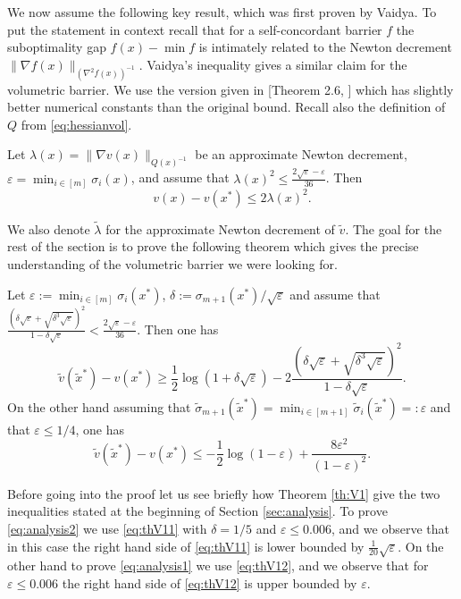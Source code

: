 \documentclass[openany]{now}
\renewcommand{\epsilon}{\varepsilon}
\renewcommand{\tilde}{\widetilde}
\begin{document}
We now assume the following key result, which was first proven by Vaidya. To put the statement in context recall that for a self-concordant barrier $f$ the suboptimality gap $f(x) - \min f$ is intimately related to the Newton decrement $\|\nabla f(x) \|_{(\nabla^2 f(x))^{-1}}$. Vaidya's inequality gives a similar claim for the volumetric barrier. We use the version given in [Theorem 2.6, \cite{Ans98}] which has slightly better numerical constants than the original bound. Recall also the definition of $Q$ from \eqref{eq:hessianvol}.

\begin{theorem} \label{th:V0}
Let $\lambda(x) = \|\nabla v(x) \|_{Q(x)^{-1}}$ be an approximate Newton decrement, $\epsilon = \min_{i \in [m]} \sigma_i(x)$, and assume that $\lambda(x)^2 \leq \frac{2 \sqrt{\epsilon} - \epsilon}{36}$. Then
$$v(x) - v(x^*) \leq 2 \lambda(x)^2 . $$
\end{theorem}
We also denote $\tilde{\lambda}$ for the approximate Newton decrement of $\tilde{v}$. The goal for the rest of the section is to prove the following theorem which gives the precise understanding of the volumetric barrier we were looking for.

\begin{theorem} \label{th:V1}
Let $\epsilon := \min_{i \in [m]} \sigma_i(x^*)$, $\delta := \sigma_{m+1}(x^*) / \sqrt{\epsilon}$ and assume that $\frac{\left(\delta \sqrt{\epsilon} + \sqrt{\delta^{3} \sqrt{\epsilon}}\right)^2}{1- \delta \sqrt{\epsilon}} < \frac{2 \sqrt{\epsilon} - \epsilon}{36}$. Then one has
\begin{equation} \label{eq:thV11}
\tilde{v}(\tilde{x}^*) - v(x^*) \geq \frac{1}{2} \log(1+\delta \sqrt{\epsilon}) - 2  \frac{\left(\delta \sqrt{\epsilon} + \sqrt{\delta^{3} \sqrt{\epsilon}}\right)^2}{1- \delta \sqrt{\epsilon}}  .
\end{equation}
On the other hand assuming that $\tilde{\sigma}_{m+1}(\tilde{x}^*) = \min_{i \in [m+1]} \tilde{\sigma}_{i}(\tilde{x}^*) =: \epsilon$ and that $\epsilon \leq 1/4$, one has 
\begin{equation} \label{eq:thV12}
\tilde{v}(\tilde{x}^*) - v(x^*) \leq - \frac{1}{2} \log(1 - \epsilon) + \frac{8 \epsilon^2}{(1-\epsilon)^2}.
\end{equation}
\end{theorem}

Before going into the proof let us see briefly how Theorem \ref{th:V1} give the two inequalities stated at the beginning of Section \ref{sec:analysis}. To prove \eqref{eq:analysis2} we use \eqref{eq:thV11} with $\delta=1/5$ and $\epsilon \leq 0.006$, and we observe that in this case the right hand side of \eqref{eq:thV11} is lower bounded by $\frac{1}{20} \sqrt{\epsilon}$. On the other hand to prove \eqref{eq:analysis1} we use \eqref{eq:thV12}, and we observe that for $\epsilon \leq 0.006$ the right hand side of \eqref{eq:thV12} is upper bounded by $\epsilon$.
\end{document}
